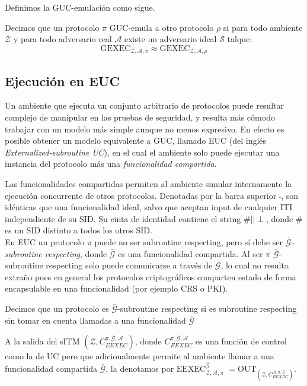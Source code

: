 Definimos la GUC-emulación como sigue.

\begin{definicion}
Decimos que un protocolo $\pi$ GUC-emula a otro protocolo $\rho$ si para todo ambiente $\mathcal{Z}$
y para todo adversario real $\mathcal{A}$ existe un adversario ideal $\mathcal{S}$ talque:
$$\mathrm{GEXEC}_{\mathcal{Z}, \mathcal{A}, \mathcal{\pi}}
\approx
\mathrm{GEXEC}_{\mathcal{Z}, \mathcal{A}, \mathcal{\rho}}$$
\end{definicion}

\subsection{Ejecución en EUC}
Un ambiente que ejecuta un conjunto arbitrario de protocolos puede resultar complejo de manipular en las
pruebas de seguridad, y resulta más cómodo trabajar con un modelo más simple aunque no menos expresivo.
En efecto es posible obtener un modelo equivalente a GUC, llamado EUC (del inglés
\textit{Externalized-subroutine UC}), en el cual el ambiente solo puede ejecutar una instancia del
protocolo más una \textit{funcionalidad compartida}.

Las funcionalidades compartidas permiten al ambiente simular internamente la ejecución concurrente de
otros protocolos. Denotadas por la barra superior $\bar{}$, son idénticas que una funcionalidad
ideal, salvo que aceptan input de cualquier ITI independiente de su SID. Su cinta de identidad contiene
el string $\#||\perp$, donde $\#$ es un SID distinto a todos los otros SID.\\

En EUC un protocolo $\pi$ puede no ser subroutine respecting, pero sí debe ser
$\bar{\mathcal{G}}$\textit{-subroutine respecting}, donde $\bar{\mathcal{G}}$ es una funcionalidad compartida.
Al ser $\pi$ $\bar{\mathcal{G}}$-subroutine respecting solo puede comunicarse a través de $\bar{\mathcal{G}}$,
lo cual no resulta extraño pues en general los protocolos criptográficos comparten estado de forma encapsulable
en una funcionalidad (por ejemplo CRS o PKI).

\begin{definicion}
Decimos que un protocolo es $\bar{\mathcal{G}}$-subroutine respecting si es subroutine respecting sin
tomar en cuenta llamadas a una funcionalidad $\bar{\mathcal{G}}$
\end{definicion}

A la salida del sITM $(\mathcal{Z}, C_{EEXEC}^{\pi, \bar{\mathcal{G}}, \mathcal{A}})$, donde
$C_{EEXEC}^{\pi, \bar{\mathcal{G}}, \mathcal{A}}$ es una función de control
como la de UC pero que adicionalmente permite al ambiente llamar a una funcionalidad compartida
$\bar{\mathcal{G}}$, la denotamos por $\mathrm{EEXEC}_{\mathcal{Z}, \mathcal{A}, \mathcal{\pi}}^{\bar{\mathcal{G}}}$
$ = \mathrm{OUT}_{(\mathcal{Z}, C_{EEXEC}^{\mathcal{A}, \pi, \bar{\mathcal{G}}})}$.\\

